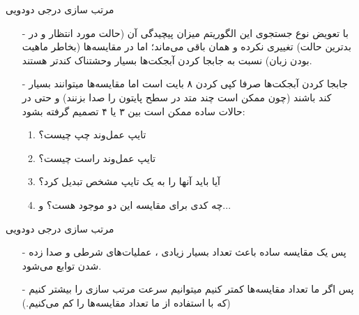 \begin{frame}{مرتب‌ سازی درجی دودویی}
\begin{itemize}\itemr
\item[-]
با تعویض نوع جستجوی‌ این الگوریتم میزان پیچیدگی آن (حالت مورد انتظار و در بدترین حالت) تغییری نکرده و همان
باقی می‌ماند؛ اما در 
مقایسه‌ها (بخاطر ماهیت  بودن زبان) نسبت به جابجا کردن آبجکت‌ها بسیار وحشتناک کند‌تر هستند.
\item[-]
جابجا کردن آبجکت‌ها صرفا کپی کردن ۸ بایت  است اما مقایسه‌ها میتوانند بسیار کند باشند (چون ممکن است چند متد در سطح پایتون را صدا بزنند) و حتی در حالات ساده ممکن است بین ۳ یا ۴ تصمیم گرفته بشود: 

\begin{enumerate}\itemr
\item 
تایپ عمل‌وند چپ چیست؟
\item 
تایپ عمل‌وند راست چیست؟
\item 
آیا باید آنها را به یک تایپ مشخص تبدیل کرد؟
\item 
چه کدی برای مقایسه این دو موجود هست؟ و...
\end{enumerate}
\end{itemize}
\end{frame}

\begin{frame}{مرتب سازی درجی دودویی}
\begin{itemize}\itemr
\item[-]
پس یک مقایسه ساده باعث تعداد بسیار زیادی ، عملیات‌های شرطی و صدا زده شدن توابع می‌شود.

\item[-]
پس اگر ما تعداد مقایسه‌ها کمتر کنیم میتوانیم سرعت مرتب سازی را بیشتر کنیم (که با استفاده از  ما تعداد مقایسه‌ها را کم می‌کنیم.)
\end{itemize}
\end{frame}